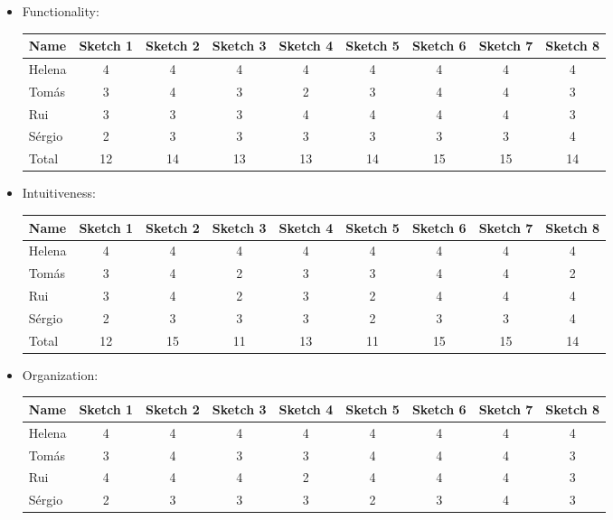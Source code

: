 \begin{itemize}
\item Functionality:  
\begin{table}[H]
\begin{tabular}{l*{8}{c}}
    Name & Sketch 1 & Sketch 2 & Sketch 3 
    & Sketch 4 & Sketch 5 & Sketch 6 & Sketch 7 
    & Sketch 8 \\
    \hline 
    Helena & 4 & 4 & 4 & 4 & 4 & 4 & 4 & 4 \\ 
    Tomás & 3 & 4 & 3 & 2 & 3 & 4 & 4 & 3 \\ 
    Rui & 3 & 3 & 3 & 4 & 4 & 4 & 4 & 3 \\ 
    Sérgio & 2 & 3 & 3 & 3 & 3 & 3 & 3 & 4 \\ 
    \hline 
    Total & 12 & 14 & 13 & 13 & 14 & 15 & 15 & 14 \\
\end{tabular}
\end{table}
\item Intuitiveness: 
\begin{table}[H]
    \begin{tabular}{l*{8}{c}}
        Name & Sketch 1 & Sketch 2 & Sketch 3 
        & Sketch 4 & Sketch 5 & Sketch 6 & Sketch 7 
        & Sketch 8 \\
        \hline 
        Helena & 4 & 4 & 4 & 4 & 4 & 4 & 4 & 4 \\ 
        Tomás & 3 & 4 & 2 & 3 & 3 & 4 & 4 & 2 \\ 
        Rui & 3 & 4 & 2 & 3 & 2 & 4 & 4 & 4 \\ 
        Sérgio & 2 & 3 & 3 & 3 & 2 & 3 & 3 & 4 \\ 
        \hline 
        Total & 12 & 15 & 11 & 13 & 11 & 15 & 15 & 14 \\
    \end{tabular}
    \end{table}
\item Organization: 
\begin{table}[H]
    \begin{tabular}{l*{8}{c}}
        Name & Sketch 1 & Sketch 2 & Sketch 3 
        & Sketch 4 & Sketch 5 & Sketch 6 & Sketch 7 
        & Sketch 8 \\
        \hline 
        Helena & 4 & 4 & 4 & 4 & 4 & 4 & 4 & 4 \\ 
        Tomás & 3 & 4 & 3 & 3 & 4 & 4 & 4 & 3 \\ 
        Rui & 4 & 4 & 4 & 2 & 4 & 4 & 4 & 3 \\ 
        Sérgio & 2 & 3 & 3 & 3 & 2 & 3 & 4 & 3 \\ 

\end{tabular}
\end{table}
\end{itemize}
